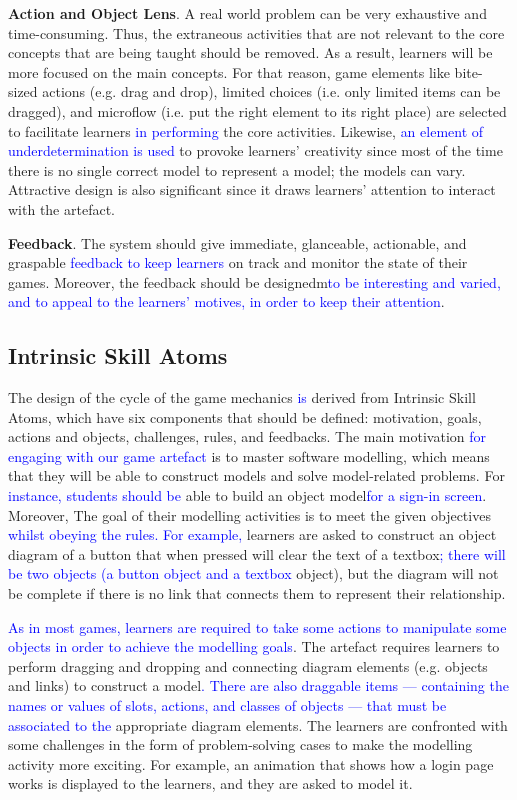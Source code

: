 \documentclass[runningheads,a4paper]{llncs}
\begin{document}
\textbf{Action and Object Lens}. A real world problem  can be very exhaustive and time-consuming. Thus, the extraneous activities that are not relevant to the core concepts that are being taught should be removed. As a result, learners will be more focused on the main concepts. For that reason, game elements like bite-sized actions (e.g. drag and drop), limited choices (i.e. only limited items can be dragged), and microflow (i.e. put the right element to its right place) are selected to facilitate learners \textcolor{blue}{in performing} the core activities. Likewise, \textcolor{blue}{an element of underdetermination is used} to provoke learners' creativity since most of the time there is no single correct model to represent a model; the models can vary. Attractive design is also significant since it draws learners' attention to interact with the artefact.

\textbf{Feedback}. The system should give immediate, glanceable, actionable, and graspable \textcolor{blue}{feedback to keep learners} on track and monitor the state of their games. Moreover, the feedback should be designedm\textcolor{blue}{to be interesting and varied, and to appeal to the learners' motives, in order to keep their attention}. 

\subsection{Intrinsic Skill Atoms}
The design of the cycle of the game mechanics \textcolor{blue}{is} derived from Intrinsic Skill Atoms\textcolor{blue}{\cite{deterding2015lens}}, which have six components that should be defined: motivation, goals, actions and objects, challenges, rules, and feedbacks. The main motivation \textcolor{blue}{for engaging with our game artefact} is to master software modelling, which means that they will be able to construct models and solve model-related problems. For\textcolor{blue}{ instance, students should be} able to build an object model\textcolor{blue}{for a sign-in screen}. Moreover, The goal of their modelling activities is to meet the given objectives \textcolor{blue}{whilst obeying the rules. For example,} learners are asked to construct an object diagram of a button that when pressed will clear the text of a textbox\textcolor{blue}{; there will be two objects (a button object and a textbox} object), but the diagram will not be complete if there is no link that connects them to represent their relationship. 

\textcolor{blue}{As in most games, learners are required to take some actions to manipulate some objects in order to achieve the modelling goals}. The artefact requires learners to perform dragging and dropping and connecting diagram elements (e.g. objects and links) to construct a model\textcolor{blue}{.  There are also draggable items --- containing the names or values of slots, actions, and classes of objects --- that must be associated to the} appropriate diagram elements. The learners are confronted with some challenges in the form of problem-solving cases to make the modelling activity more exciting. For example, an animation that shows how a login page works is displayed to the learners, and they are asked to model it. 
\end{document}
